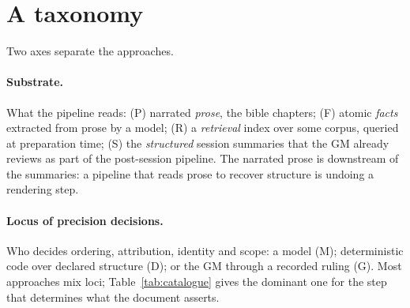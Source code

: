 \documentclass[11pt]{article}
\begin{document}
\section{A taxonomy}
\label{sec:taxonomy}

Two axes separate the approaches.

\paragraph{Substrate.} What the pipeline reads: (P) narrated \emph{prose}, the bible chapters;
(F) atomic \emph{facts} extracted from prose by a model; (R) a \emph{retrieval} index over some
corpus, queried at preparation time; (S) the \emph{structured} session summaries that the GM already
reviews as part of the post-session pipeline. The narrated prose is downstream of the summaries: a
pipeline that reads prose to recover structure is undoing a rendering step.

\paragraph{Locus of precision decisions.} Who decides ordering, attribution, identity and scope:
a model (M); deterministic code over declared structure (D); or the GM through a recorded ruling (G).
Most approaches mix loci; Table~\ref{tab:catalogue} gives the dominant one for the step that
determines what the document asserts.
\end{document}
